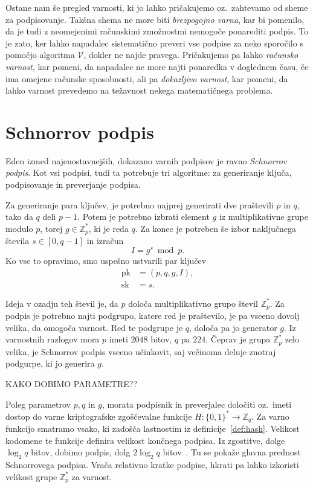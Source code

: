 \documentclass[isrm2, tisk]{fmfdelo}
\newcommand{\Z}{\mathbb Z}
\begin{document}
Ostane nam še pregled varnosti, ki jo lahko pričakujemo oz.\ zahtevamo od sheme za podpisovanje. 
Takšna shema ne more biti \textit{brezpogojno varna}, kar bi pomenilo, da je tudi z neomejenimi 
računskimi zmožnostmi nemogoče ponarediti podpis. To je zato, ker lahko napadalec sistematično 
preveri vse podpise za neko sporočilo s pomočjo algoritma $\mathcal{V}$, dokler ne najde pravega. Pričakujemo 
pa lahko \textit{računsko varnost}, kar pomeni, da napadalec ne more najti ponaredka v doglednem času,
če ima omejene računske sposobnosti, ali pa \textit{dokazljivo varnost}, kar pomeni, da lahko 
varnost prevedemo na težavnost nekega matematičnega problema.

\section{Schnorrov podpis}
Eden izmed najenostavnejših, dokazano varnih podpisov je ravno \textit{Schnorrov podpis}. Kot vsi 
podpisi, tudi ta potrebuje tri algoritme: za generiranje ključa, podpisovanje in preverjanje 
podpisa. 

Za generiranje para ključev, je potrebno najprej generirati dve praštevili $p$ in $q$, tako da $q$ 
deli $p-1$. Potem je potrebno izbrati element $g$ iz multiplikativne grupe modulo $p$, torej 
$g \in \Z_p^*$, ki je reda $q$. Za konec je potreben še izbor naključnega števila $s \in [0, q - 1]$
in izračun 
$$ 
I = g^s \bmod p.
$$
Ko vse to opravimo, smo uspešno ustvarili par ključev
\begin{align*}
\text{pk} &= (p, q, g, I), \\
\text{sk} &= s.
\end{align*}

Ideja v ozadju teh števil je, da $p$ določa multiplikativno grupo števil $\Z_p^*$. Za podpis je 
potrebno najti podgrupo, katere red je praštevilo, je pa vseeno dovolj velika, da omogoča varnost. 
Red te podgrupe je $q$, določa pa jo generator $g$. Iz varnostnih razlogov mora $p$ imeti $2048$ 
bitov, $q$ pa $224$. Čeprav je grupa $\Z_p^*$ zelo velika, je Schnorrov podpis vseeno učinkovit, 
saj večinoma deluje znotraj podgurpe, ki jo generira $g$.

KAKO DOBIMO PARAMETRE??

Poleg parametrov $p, q$ in $g$, morata podpisnik in preverjalec določiti oz.\ imeti dostop do varne 
kriptografske zgoščevalne funkcije $H : \{0, 1\}^* \rightarrow \Z_q$. Za varno funkcijo smatramo vsako, 
ki zadošča lastnostim iz definicije~\ref{def:hash}. Velikost kodomene te funkcije definira velikost 
končnega podpisa. Iz zgostitve, dolge $\log_2 q$ bitov, dobimo podpis, dolg $2 \log_2 q$ bitov~\cite{
stinson2023crypto}. Tu se pokaže glavna prednost Schnorrovega podpisa. Vrača relativno kratke podpise, 
hkrati pa lahko izkoristi velikost grupe $\Z_p^*$ za varnost.
\end{document}
